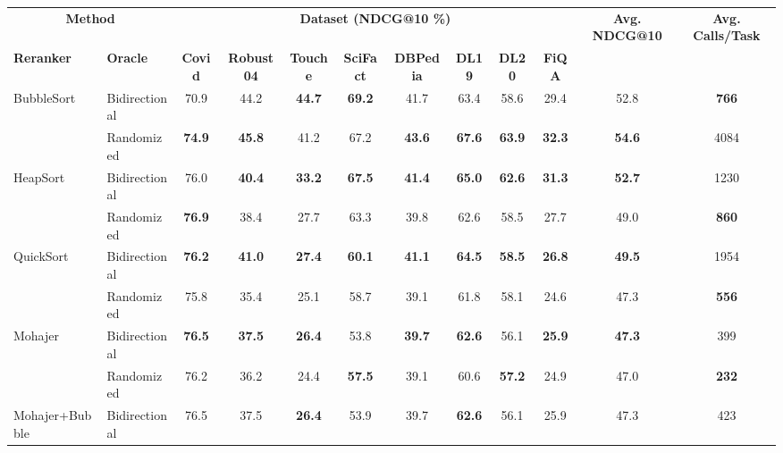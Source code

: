 \documentclass[11pt]{article}
\begin{document}
\begin{table}[H]
\centering
\footnotesize
\setlength{\tabcolsep}{3pt}
\renewcommand{\arraystretch}{1.12}
\begin{adjustbox}{max width=\textwidth}
\begin{tabular}{llcccccccccc}
\toprule
\multicolumn{2}{c}{\textbf{Method}} &
\multicolumn{8}{c}{\textbf{Dataset (NDCG@10 \%)}} &
\textbf{Avg. NDCG@10} & \textbf{Avg. Calls/Task} \\
\cmidrule(lr){1-2}\cmidrule(lr){3-10}\cmidrule(lr){11-12}
\textbf{Reranker} & \textbf{Oracle} &
\textbf{Covid} & \textbf{Robust04} & \textbf{Touche} & \textbf{SciFact} &
\textbf{DBPedia} & \textbf{DL19} & \textbf{DL20} & \textbf{FiQA} & & \\
\midrule
\multirow{2}{*}{BubbleSort} & Bidirectional
& 70.9 & 44.2 & \textbf{44.7} & \textbf{69.2} & 41.7 & 63.4 & 58.6 & 29.4 & 52.8 & \textbf{766} \\
& Randomized
& \textbf{74.9} & \textbf{45.8} & 41.2 & 67.2 & \textbf{43.6} & \textbf{67.6} & \textbf{63.9} & \textbf{32.3} & \textbf{54.6} & 4084 \\
\midrule
\multirow{2}{*}{HeapSort} & Bidirectional
& 76.0 & \textbf{40.4} & \textbf{33.2} & \textbf{67.5} & \textbf{41.4} & \textbf{65.0} & \textbf{62.6} & \textbf{31.3} & \textbf{52.7} & 1230 \\
& Randomized
& \textbf{76.9} & 38.4 & 27.7 & 63.3 & 39.8 & 62.6 & 58.5 & 27.7 & 49.0 & \textbf{860} \\
\midrule
\multirow{2}{*}{QuickSort} & Bidirectional
& \textbf{76.2} & \textbf{41.0} & \textbf{27.4} & \textbf{60.1} & \textbf{41.1} & \textbf{64.5} & \textbf{58.5} & \textbf{26.8} & \textbf{49.5} & 1954 \\
& Randomized
& 75.8 & 35.4 & 25.1 & 58.7 & 39.1 & 61.8 & 58.1 & 24.6 & 47.3 & \textbf{556} \\
\midrule
\multirow{2}{*}{Mohajer} & Bidirectional
& \textbf{76.5} & \textbf{37.5} & \textbf{26.4} & 53.8 & \textbf{39.7} & \textbf{62.6} & 56.1 & \textbf{25.9} & \textbf{47.3} & 399 \\
& Randomized
& 76.2 & 36.2 & 24.4 & \textbf{57.5} & 39.1 & 60.6 & \textbf{57.2} & 24.9 & 47.0 & \textbf{232} \\
\midrule
\multirow{2}{*}{Mohajer+Bubble} & Bidirectional
& 76.5 & 37.5 & \textbf{26.4} & 53.9 & 39.7 & \textbf{62.6} & 56.1 & 25.9 & 47.3 & 423 \\

\end{tabular}
\end{adjustbox}
\end{table}
\end{document}
